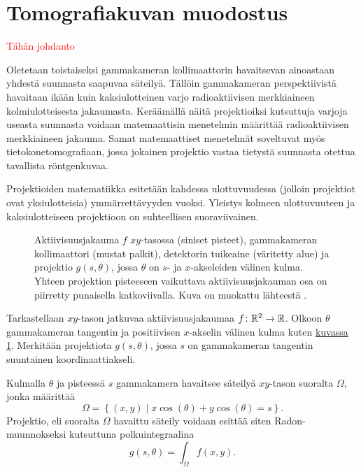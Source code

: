 \section{Tomografiakuvan muodostus}

\textcolor{red}{Tähän johdanto}

Oletetaan toistaiseksi gammakameran kollimaattorin havaitsevan ainoastaan yhdestä suunnasta saapuvaa säteilyä. Tällöin gammakameran perspektiivistä havaitaan ikään kuin kaksiulotteinen varjo radioaktiivisen merkkiaineen kolmiulotteisesta jakaumasta. Keräämällä näitä projektioiksi kutsuttuja varjoja useasta suunnasta voidaan matemaattisin menetelmin määrittää radioaktiivisen merkkiaineen jakauma\cite{cherry_single_2012, bruyant_analytic_2002, beister_iterative_2012, willemink_evolution_2019, van_audenhaege_review_2015, bercovich_medical_2018}. Samat matemaattiset menetelmät soveltuvat myös tietokonetomografiaan, jossa jokainen projektio vastaa tietystä suunnasta otettua tavallista röntgenkuvaa.

Projektioiden matematiikka esitetään kahdessa ulottuvuudessa (jolloin projektiot ovat yksiulotteisia) ymmärrettävyyden vuoksi. Yleistys kolmeen ulottuvuuteen ja kaksiulotteiseen projektioon on suhteellisen suoraviivainen.

\begin{figure}[H]
    \centering
    \captionsetup{width=.9\textwidth}
    
    \caption{Aktiivisuusjakauma $f$ $xy$-tasossa (siniset pisteet), gammakameran kollimaattori (mustat palkit), detektorin tuikeaine (väritetty alue) ja projektio $g(s, \theta)$, jossa $\theta$ on $s$- ja $x$-akseleiden välinen kulma. Yhteen projektion pisteeseen vaikuttava aktiivisuusjakauman osa on piirretty punaisella katkoviivalla. Kuva on muokattu lähteestä \cite{bruyant_analytic_2002}.}
    \label{fig:projektio}
\end{figure}

Tarkastellaan $xy$-tason jatkuvaa aktiivisuusjakaumaa $f\colon\mathbb{R}^{2}\to\mathbb{R}$. Olkoon $\theta$ gammakameran tangentin ja positiivisen $x$-akselin välinen kulma kuten \hyperref[fig:projektio]{kuvassa \ref*{fig:projektio}}. Merkitään projektiota $g(s, \theta)$, jossa $s$ on gammakameran tangentin suuntainen koordinaattiakseli.

Kulmalla $\theta$ ja pisteessä $s$ gammakamera havaitsee säteilyä $xy$-tason suoralta $\Omega$, jonka määrittää
\begin{equation*}
    \Omega=\left\{ (x, y) \mid x\cos(\theta)+y\cos(\theta)=s \right\}.
\end{equation*}
Projektio, eli suoralta $\Omega$ havaittu säteily voidaan esittää siten Radon-muunnokseksi kutsuttuna polkuintegraalina\cite{radon_determination_1986, bruyant_analytic_2002}
\begin{equation}\label{eqn:radon-muunnos}
    g(s, \theta)=\int_{\Omega}f(x, y).
\end{equation}

